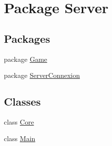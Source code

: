 \hypertarget{namespaceServer}{}\section{Package Server}
\label{namespaceServer}
\subsection*{Packages}
\begin{DoxyCompactItemize}
\item 
package \mbox{\hyperlink{namespaceServer_1_1Game}{Game}}
\item 
package \mbox{\hyperlink{namespaceServer_1_1ServerConnexion}{Server\+Connexion}}
\end{DoxyCompactItemize}
\subsection*{Classes}
\begin{DoxyCompactItemize}
\item 
class \mbox{\hyperlink{classServer_1_1Core}{Core}}
\item 
class \mbox{\hyperlink{classServer_1_1Main}{Main}}
\end{DoxyCompactItemize}
